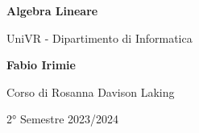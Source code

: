 \begin{titlepage}
	\begin{center}
		\vspace*{1cm}

		\Huge
		\textbf{Algebra Lineare}

		\vspace{0.5cm}
		\LARGE
		UniVR - Dipartimento di Informatica

		\vspace{1.5cm}

		\textbf{Fabio Irimie}

		\vfill


		\vspace{0.8cm}

    Corso di Rosanna Davison Laking

		2° Semestre 2023/2024

	\end{center}
\end{titlepage}
